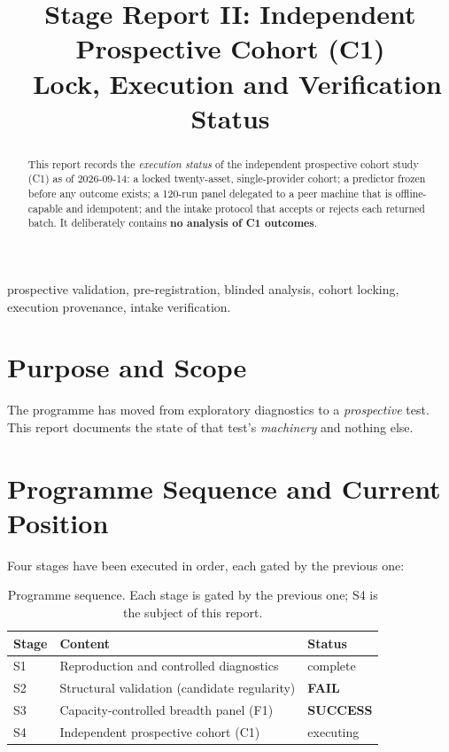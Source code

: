 \documentclass[conference]{IEEEtran}
\begin{document}
\title{Stage Report II: Independent Prospective Cohort (C1)\\\ Lock, Execution and Verification Status}

\author{
}

\maketitle

\begin{abstract}
This report records the \emph{execution status} of the independent prospective cohort study (C1)
as of 2026-09-14: a locked twenty-asset, single-provider cohort; a predictor frozen before any
outcome exists; a 120-run panel delegated to a peer machine that is offline-capable and idempotent;
and the intake protocol that accepts or rejects each returned batch. It deliberately contains
\textbf{no analysis of C1 outcomes}.
\end{abstract}

\begin{IEEEkeywords}
prospective validation, pre-registration, blinded analysis, cohort locking, execution provenance,
intake verification.
\end{IEEEkeywords}

\section{Purpose and Scope}

The programme has moved from exploratory diagnostics to a \emph{prospective} test. This report
documents the state of that test's \emph{machinery} and nothing else.

\section{Programme Sequence and Current Position}
\label{sec:seq}

Four stages have been executed in order, each gated by the previous one:

\begin{table}[!t]
\centering
\footnotesize
\setlength{\tabcolsep}{3pt}
\begin{tabular}{@{}p{}p{}p{}@{}}
\toprule
Stage & Content & Status \\
\midrule
S1 & Reproduction and controlled diagnostics & complete \\
S2 & Structural validation (candidate regularity) & \textbf{FAIL} \\
S3 & Capacity-controlled breadth panel (F1) & \textbf{SUCCESS} \\
S4 & Independent prospective cohort (C1) & executing \\
\bottomrule
\end{tabular}
\caption{Programme sequence. Each stage is gated by the previous one; S4 is the subject of this
report.}
\label{tab:seq}
\end{table}
\end{document}
